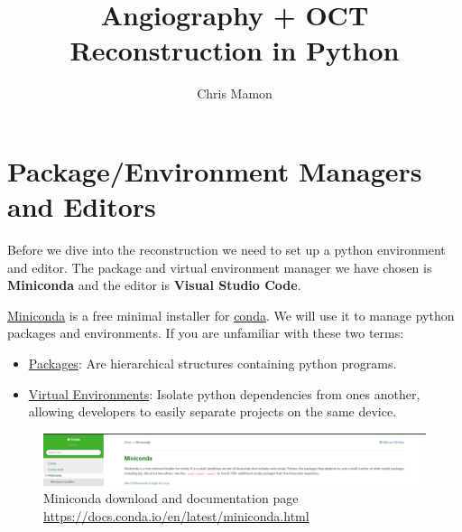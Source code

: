 \documentclass[10pt,a4paper]{article}
\author{Chris Mamon}
\title{Angiography + OCT Reconstruction in Python}
\date{}
\begin{document}
	\maketitle
	\section{Package/Environment Managers and Editors}
		Before we dive into the reconstruction we need to set up a python environment and editor. The package and virtual environment manager we have chosen is \textbf{Miniconda} and the editor is \textbf{Visual Studio Code}.
		
		\href{https://docs.conda.io/en/latest/miniconda.html}{Miniconda} is a free minimal installer for \href{https://www.anaconda.com/distribution/}{conda}. We will use it to manage python packages and environments. If you are unfamiliar with these two terms:
		\begin{itemize}
			\item \href{https://realpython.com/python-modules-packages/#reloading-a-module}{Packages}: Are hierarchical structures 	containing python programs.	
			\item \href{https://www.geeksforgeeks.org/python-virtual-environment/}{Virtual Environments}: Isolate python dependencies from ones another, allowing developers to easily separate projects on the same device.
		\end{itemize}
		\begin{figure}[h]
			\centering
			\includegraphics[scale=0.25]{figures/miniconda.PNG}
			\caption{Miniconda download and documentation page \url{https://docs.conda.io/en/latest/miniconda.html}}
		\end{figure}
		
\end{document}
